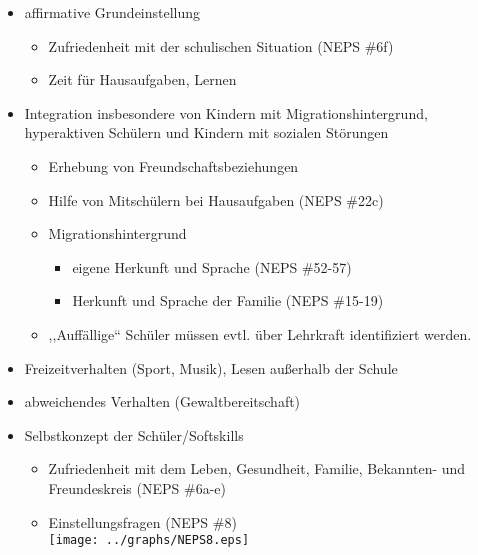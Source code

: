 \documentclass[a4,12pt]{article}
\begin{document}
	\begin{itemize}

		\item affirmative Grundeinstellung

			\begin{itemize}
				\item Zufriedenheit mit der schulischen Situation (NEPS \#6f) 

				\item Zeit für Hausaufgaben, Lernen

			\end{itemize}

		\item Integration insbesondere von Kindern mit Migrationshintergrund,
        hyperaktiven Schülern und Kindern mit sozialen Störungen
		
			\begin{itemize}

				\item Erhebung von Freundschaftsbeziehungen

				\item Hilfe von Mitschülern bei Hausaufgaben (NEPS \#22c)

				\item Migrationshintergrund 
				
					\begin{itemize}
					
					\item eigene Herkunft und Sprache (NEPS \#52-57)

					\item Herkunft und Sprache der Familie (NEPS \#15-19)

					\end{itemize}

				\item ,,Auffällige“ Schüler müssen evtl. über Lehrkraft
                identifiziert werden.
				
				 \end{itemize}
				
				 \item Freizeitverhalten (Sport, Musik), Lesen außerhalb der
                Schule

		\item abweichendes Verhalten (Gewaltbereitschaft)

		\item Selbstkonzept der Schüler/Softskills

			\begin{itemize}
		
			\item Zufriedenheit mit dem Leben, Gesundheit, Familie,
	              Bekannten- und Freundeskreis (NEPS \#6a-e)

			\item Einstellungsfragen (NEPS \#8) \\
			\texttt{[image: ../graphs/NEPS8.eps]}

			\end{itemize}


	\end{itemize}
	
\end{document}
